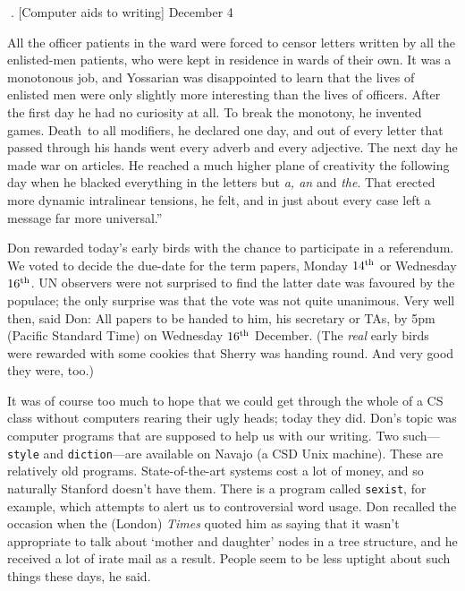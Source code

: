 . [Computer aids to writing] \pmr December 4

{\narrower\smallskip\noindent
{}All the officer patients in the ward were forced to censor letters
  written by all the enlisted-men patients, who were kept in residence
  in wards of their own. It was a monotonous job, and Yossarian was
  disappointed to learn that the lives of enlisted men were only
  slightly more interesting than the lives of officers. After the first
  day he had no curiosity at all.  To break the monotony, he invented
  games. Death~to all modifiers, he declared one day, and out of every
  letter that passed through his hands went every adverb and every
  adjective.  The next day he made war on articles. He reached a much
  higher plane of creativity the following day when he blacked
  everything in the letters but {\it a, an\/} and {\it the}.  That erected
  more dynamic intralinear tensions, he felt, and in just about every
  case left a message far more universal.''
\smallskip}

Don rewarded today's early birds with the chance to participate in a
referendum. We voted to decide the due-date for the term papers,
Monday ${14^{\rm th}}$ or Wednesday ${16^{\rm th}}$. UN observers were not
surprised to find the latter date was favoured by the populace; the
only surprise was that the vote was not quite unanimous. Very well
then, said Don: All papers to be handed to him, his secretary or TAs,
by 5pm (Pacific Standard Time) on Wednesday ${16^{\rm th}}$ December.  (The
{\it real\/} early birds were rewarded with some cookies that Sherry was
handing round. And very good they were, too.)

It was of course too much to hope that we could get through the whole
of a CS class without computers rearing their ugly heads; today they
did. Don's topic was computer programs that are supposed to help us
with our writing. Two such---{\tt style} and {\tt diction}---are available on
Navajo (a CSD Unix machine). These are relatively old programs.
State-of-the-art systems cost a lot of money, and so naturally
Stanford doesn't have them. There is a program called {\tt sexist}, for
example, which attempts to alert us to controversial word usage. Don
recalled the occasion when the (London) {\sl Times\/} quoted him as
saying that it wasn't appropriate to talk about `mother and daughter'
nodes in a tree structure, and he received a lot of irate mail as a
result. People seem to be less uptight about such things these days,
he said.

